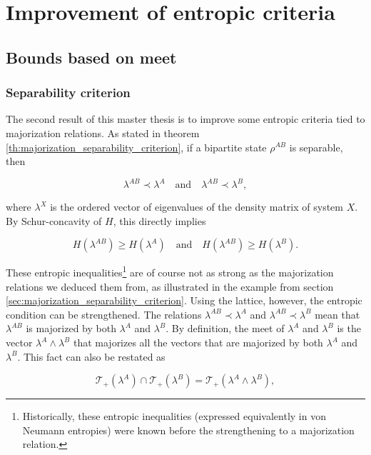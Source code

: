 \chapter{Improvement of entropic criteria} \label{chap:criteria}

\section{Bounds based on meet}

\subsection{Separability criterion}

The second result of this master thesis is to improve some entropic criteria tied to majorization relations. As stated in theorem \ref{th:majorization_separability_criterion}, if a bipartite state $\rho^{AB}$ is separable, then

\begin{equation}
    \lambda^{AB} \prec \lambda^A \quad \text{and} \quad \lambda^{AB} \prec \lambda^{B},
\end{equation}

where $\lambda^X$ is the ordered vector of eigenvalues of the density matrix of system $X$. By Schur-concavity of $H$, this directly implies

\begin{equation}
    H(\lambda^{AB}) \geq H(\lambda^A) \quad \text{and} \quad H(\lambda^{AB}) \geq H(\lambda^B).
\end{equation}

These entropic inequalities\footnote{Historically, these entropic inequalities (expressed equivalently in von Neumann entropies) were known before the strengthening to a majorization relation.} are of course not as strong as the majorization relations we deduced them from, as illustrated in the example from section \ref{sec:majorization_separability_criterion}. Using the lattice, however, the entropic condition can be strengthened. The relations $\lambda^{AB} \prec \lambda^A$ and $\lambda^{AB} \prec \lambda^{B}$ mean that $\lambda^{AB}$ is majorized by both $\lambda^A$ and $\lambda^B$. By definition, the meet of $\lambda^A$ and $\lambda^B$ is the vector $\lambda^A \wedge \lambda^B$ that majorizes all the vectors that are majorized by both $\lambda^A$ and $\lambda^B$. This fact can also be restated as 

\begin{equation}
    \mathcal{T}_+(\lambda^A) \cap \mathcal{T}_+(\lambda^B) = \mathcal{T}_+(\lambda^A \wedge \lambda^B),
\end{equation}

